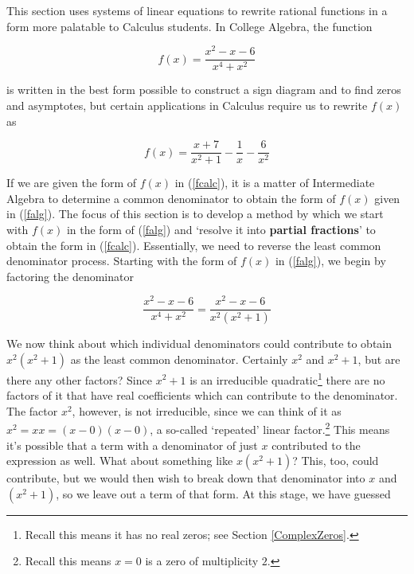 

\setcounter{footnote}{0}

\label{ParFrac}

\setlength{\extrarowheight}{0pt}

This section uses systems of linear equations to rewrite rational functions in a form more palatable to Calculus students. In College Algebra, the function 

\begin{equation} \label{falg} f(x) = \dfrac{x^2-x-6}{x^4+x^2} \tag{1} \end{equation}

is written in the best form possible to construct a sign diagram and to find zeros and asymptotes, but certain applications in Calculus require us to rewrite $f(x)$ as 

\begin{equation} \label{fcalc} f(x) = \dfrac{x+7}{x^2+1} - \dfrac{1}{x} - \dfrac{6}{x^2}  \tag{2} \end{equation}

If we are given the form of $f(x)$ in (\ref{fcalc}), it is a matter of Intermediate Algebra to determine a common denominator to obtain the form of $f(x)$ given in (\ref{falg}).  The focus of this section is to develop a method by which we start with $f(x)$ in the form of (\ref{falg}) and `resolve it into  \textbf{partial fractions}' to obtain the form in (\ref{fcalc}).  Essentially, we need to reverse the least common denominator process.  Starting with the form of $f(x)$ in (\ref{falg}), we begin by factoring the denominator

\[ \dfrac{x^2-x-6}{x^4+x^2} =  \dfrac{x^2-x-6}{x^2 \left(x^2+1\right)} \]

We now think about which individual denominators could contribute to obtain  $x^2 \left(x^2+1\right)$ as the least common denominator.  Certainly $x^2$ and $x^2+1$, but are there any other factors?  Since $x^2+1$ is an irreducible quadratic\footnote{Recall this means it has no real zeros;  see Section \ref{ComplexZeros}.} there are no factors of it that have real coefficients which can contribute to the denominator.  The factor $x^2$, however, is not irreducible, since we can think of it as $x^2 = xx = (x-0)(x-0)$, a so-called `repeated' linear factor.\footnote{Recall this means $x=0$ is a zero of multiplicity $2$.}   This means it's possible that a term with a denominator of just $x$ contributed to the expression as well.  What about something like $x \left(x^2+1\right)$?  This, too, could contribute, but we would then wish to break down that denominator into $x$ and $\left(x^2+1\right)$, so we leave out a term of that form.  At this stage, we have guessed

